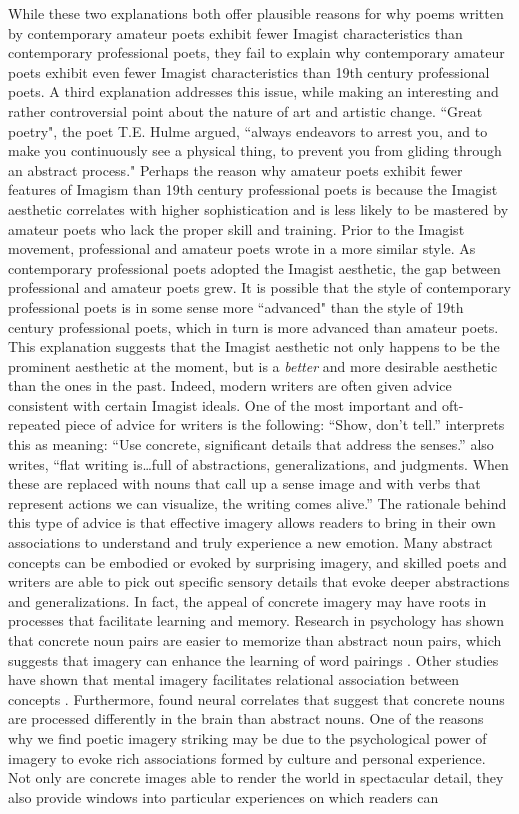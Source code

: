 \documentclass{book}
\begin{document}
While these two explanations both offer plausible reasons for why poems written by contemporary amateur poets exhibit fewer Imagist characteristics than contemporary professional poets, they fail to explain why contemporary amateur poets exhibit even fewer Imagist characteristics than 19th century professional poets. A third explanation addresses this issue, while making an interesting and rather controversial point about the nature of art and artistic change. ``Great poetry", the poet T.E. Hulme argued, ``always endeavors to arrest you, and to make you continuously see a physical thing, to prevent you from gliding through an abstract process." Perhaps the reason why amateur poets exhibit fewer features of Imagism than 19th century professional poets is because the Imagist aesthetic correlates with higher sophistication and is less likely to be mastered by amateur poets who lack the proper skill and training. Prior to the Imagist movement, professional and amateur poets wrote in a more similar style. As contemporary professional poets adopted the Imagist aesthetic, the gap between professional and amateur poets grew. It is possible that the style of contemporary professional poets is in some sense more ``advanced" than the style of 19th century professional poets, which in turn is more advanced than amateur poets. This explanation  suggests that the Imagist aesthetic not only happens to be the prominent aesthetic at the moment, but is a \emph{better} and more desirable aesthetic than the ones in the past. Indeed, modern writers are often given advice consistent with certain Imagist ideals. One of the most important and oft-repeated piece of advice for writers is the following: ``Show, don't tell.'' \cite{Burroway} interprets this as meaning: ``Use concrete, significant details that address the senses.''  \cite{Burroway} also writes, ``flat writing is\dots full of abstractions, generalizations, and judgments. When these are replaced with nouns that call up a sense image and with verbs that represent actions we can visualize, the writing comes alive.'' The rationale behind this type of advice is that effective imagery allows readers to bring in their own associations to understand and truly experience a new emotion. Many abstract concepts can be embodied or evoked by surprising imagery, and skilled poets and writers are able to pick out specific sensory details that evoke deeper abstractions and generalizations. In fact, the appeal of concrete imagery may have roots in processes that facilitate learning and memory. Research in psychology has shown that concrete noun pairs are easier to memorize than abstract noun pairs, which suggests that imagery can enhance the learning of word pairings \citep{pairing}. Other studies have shown that mental imagery facilitates relational association between concepts \citep{imagery}. Furthermore, \cite{neuro} found neural correlates that suggest that concrete nouns are processed differently in the brain than abstract nouns. One of the reasons why we find poetic imagery striking may be due to the psychological power of imagery to evoke rich associations formed by culture and personal experience. Not only are concrete images able to render the world in spectacular detail, they also provide windows into particular experiences on which readers can 
\end{document}
